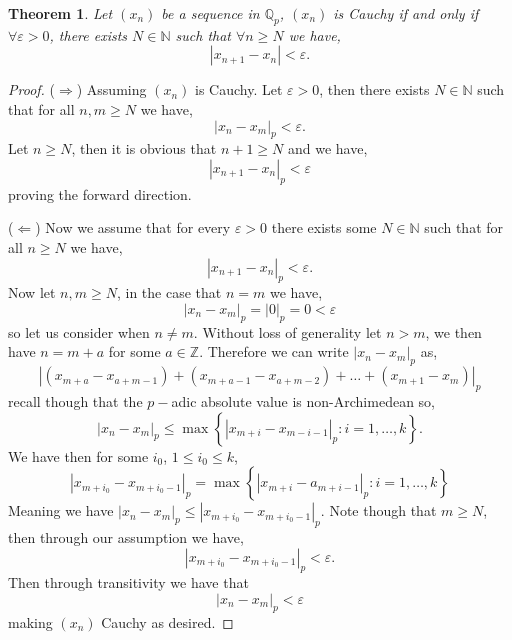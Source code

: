 \documentclass[12pt]{article}
\newtheorem{thm}{Theorem}[section]
\theoremstyle{definition}
\theoremstyle{remark}
\newcommand{\zz}{\mathbb Z}   %
\newcommand{\qq}{\mathbb Q}   %
\newcommand{\nn}{\mathbb N}   %
\newcommand{\abs}[1]{\left\lvert#1\right\rvert} %
\renewcommand{\epsilon}{\varepsilon}
\renewcommand{\geq}{\geqslant}
\renewcommand{\leq}{\leqslant}
\newcommand{\lrc}[1]{\left\{#1\right\}}
\begin{document}
    \begin{thm}
      Let $(x_n)$ be a sequence in $\qq_p$, $(x_n)$ is Cauchy if and only if $\forall \epsilon >0$, there exists $N \in \nn$ such that $\forall n \geq N$ we have,
      \[\abs{x_{n+1} - x_n} < \epsilon.\]
    \end{thm}
    \begin{proof}
      ($\Rightarrow$) Assuming $(x_n)$ is Cauchy. Let $\epsilon > 0$, then there exists $N\in \nn$ such that for all $n,m \geq N$ we have,
      \[\abs{x_n - x_m}_p < \epsilon.\] Let $n\geq N$, then it is obvious that $n+1 \geq N$ and we have,
      \[\abs{x_{n+1} - x_n}_p < \epsilon\] proving the forward direction. 

      ($\Leftarrow$) Now we assume that for every $\epsilon > 0$ there exists some $N\in \nn$ such that for all $n \geq N$ we have,
      \[\abs{x_{n+1} - x_n}_p < \epsilon.\]
      Now let $n,m \geq N$, in the case that $n=m$ we have,
      \[\abs{x_n - x_m}_p = \abs{0}_p = 0 < \epsilon\]
      so let us consider when $n\neq m$. Without loss of generality let $n > m$, we then have $n = m + a$ for some $a \in \zz$. Therefore we can write $\abs{x_n - x_m}_p$ as,
      \[\abs{(x_{m+a} - x_{a + m -1}) + (x_{m+a - 1} - x_{a + m -2}) + \dots + (x_{m+1} - x_{ m})}_p\]
      recall though that the $p-$adic absolute value is non-Archimedean so,
      \[\abs{x_n - x_m}_p \leq \max\lrc{\abs{x_{m+i} - x_{m-i -1}}_p : i = 1,\dots,k}.\]
      We have then for some $i_0$, $1 \leq i_0 \leq k$,
      \[\abs{x_{m + i_0} - x_{m + i_0 - 1}}_p = \max\lrc{\abs{x_{m+i} - a_{m+i -1}}_p : i = 1, \dots , k}\]
      Meaning we have $\abs{x_n - x_m}_p \leq \abs{x_{m+ i_0} - x_{m + i_0 -1}}_p$. Note though that $m \geq N$, then through our assumption we have,
      \[\abs{x_{m + i_0} - x_{m + i_0 - 1}}_p < \epsilon.\]
      Then through transitivity we have that
      \[\abs{x_n - x_m}_p < \epsilon\]
      making $(x_n)$ Cauchy as desired. 
    \end{proof}
\end{document}
